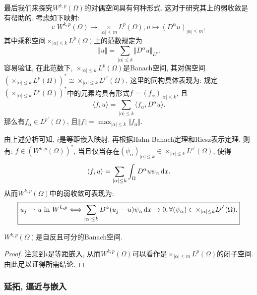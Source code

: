 最后我们来探究$W^{k, p}(\Omega)$的对偶空间具有何种形式. 这对于研究其上的弱收敛是有帮助的.
考虑如下映射:
\begin{equation*}
    i\colon W^{k, p}(\Omega) \rightarrow \mathop{\times}\limits_{|\alpha| \leq m}L^p(\Omega), u \mapsto (D^{\alpha}u)_{|\alpha| \leq m},
\end{equation*}
其中乘积空间$\times_{|\alpha| \leq k}L^p(\Omega)$上的范数规定为
\begin{equation*}
    \Vert u \Vert = \sum_{|\alpha| \leq k}\Vert D^{\alpha}u \Vert_{L^p}.
\end{equation*}
容易验证, 在此范数下, $\times_{|\alpha| \leq k}L^p(\Omega)$是Banach空间, 其对偶空间$(\times_{|\alpha| \leq k}L^p(\Omega))^* \cong \times_{|\alpha| \leq k}L^{p'}(\Omega)$.
这里的同构具体表现为: 规定$(\times_{|\alpha| \leq k}L^p(\Omega))^*$中的元素均具有形式$f = (f_{\alpha})_{|\alpha| \leq k}$, 且 
\begin{equation*}
    \langle f, u\rangle = \sum_{|\alpha| \leq k}\langle f_{\alpha}, D^{\alpha}u\rangle.
\end{equation*} 
那么有$f_{\alpha} \in L^{p'}(\Omega)$, 且$\Vert f \Vert = \max_{|\alpha| \leq k}\Vert f_{\alpha} \Vert$.

由上述分析可知, $i$是等距嵌入映射. 再根据Hahn-Banach定理和Riesz表示定理, 则有: $f \in (W^{k, p}(\Omega))^*$, 当且仅当存在$(\psi_{\alpha})_{|\alpha| \leq k} \in \times_{|\alpha| \leq k}L^{p'}(\Omega)$, 使得
\begin{equation*}
    \langle f, u\rangle = \sum_{|\alpha| \leq k}\int_{\Omega}D^{\alpha}u\psi_{\alpha} \,{\rm d}x.
\end{equation*} 
从而$W^{k, p}(\Omega)$中的弱收敛可表现为:
\begin{equation*}
    \boxed{u_j \rightharpoonup u \ \text{in}\ W^{k, p} \Longleftrightarrow \sum_{|\alpha| \leq k}D^{\alpha}(u_j - u)\psi_{\alpha} \,{\rm d}x \rightarrow 0, \forall (\psi_{\alpha}) \in \times_{|\alpha| \leq k}L^{p'}(\Omega).}
\end{equation*}

\begin{corollary}
    $W^{k, p}(\Omega)$是自反且可分的Banach空间.
    \begin{proof}
        注意到$i$是等距嵌入, 从而$W^{k, p}(\Omega)$可以看作是$\times_{|\alpha| \leq m}L^p(\Omega)$的闭子空间.
        由此足以证得所需结论.
    \end{proof}
\end{corollary}

\subsubsection{延拓, 逼近与嵌入}

